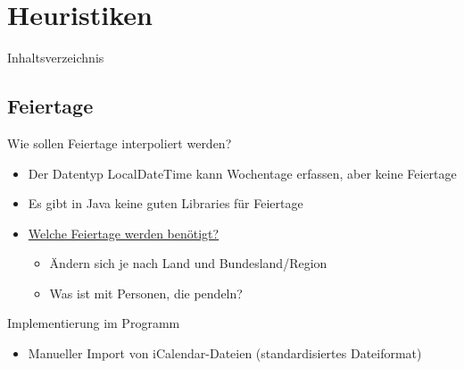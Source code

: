 \section{Heuristiken}
\begin{frame}{Inhaltsverzeichnis}
\tableofcontents[currentsection]
\end{frame}

\subsection{Feiertage}
\begin{frame}{\insertsubsectionhead}
\begin{block}{Wie sollen Feiertage interpoliert werden?}
\begin{itemize}
\item Der Datentyp LocalDateTime kann Wochentage erfassen, aber keine Feiertage
\item Es gibt in Java keine guten Libraries für Feiertage
\item \underline{Welche Feiertage werden benötigt?}
\begin{itemize}
\item Ändern sich je nach Land und Bundesland/Region
\item Was ist mit Personen, die pendeln?
\end{itemize}
\end{itemize}
\end{block}
\begin{block}{Implementierung im Programm}
\begin{itemize}
\item Manueller Import von iCalendar-Dateien (standardisiertes Dateiformat)
\end{itemize}
\end{block}
\end{frame}